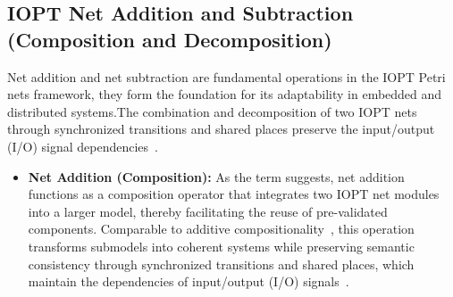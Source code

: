 \subsection{IOPT Net Addition and Subtraction (Composition and Decomposition)}
\label{sub:net_addicion}

Net addition and net subtraction are fundamental operations in the IOPT Petri nets framework, they form the foundation for its adaptability in embedded and distributed systems.The combination and decomposition of two IOPT nets through synchronized transitions and shared places preserve the input/output (I/O) signal dependencies~\cite{add1}.

\begin{itemize}
    \item \textbf{Net Addition (Composition): }     
As the term suggests, net addition functions as a composition operator that integrates two IOPT net modules into a larger model, thereby facilitating the reuse of pre-validated components. Comparable to additive compositionality~\cite{add2}, this operation transforms submodels into coherent systems while preserving semantic consistency through synchronized transitions and shared places, which maintain the dependencies of input/output (I/O) signals~\cite{add1}.
\end{itemize}

